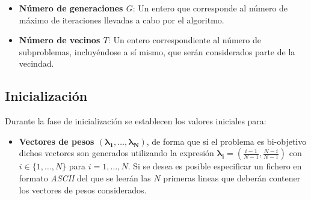 \begin{itemize}
 \item \textbf{Número de generaciones $G$}:  Un entero que corresponde al número de máximo de iteraciones llevadas a cabo por el algoritmo.\\
    
    \item \textbf{Número de vecinos $T$}: Un entero correspondiente al número de subproblemas, incluyéndose a sí mismo, que serán considerados parte de la vecindad.\\
\end{itemize}

\subsection{Inicialización}

Durante la fase de inicialización se establecen los valores iniciales para:\\

\begin{itemize}
\item\textbf{ Vectores de pesos $(\boldsymbol{\lambda_1}, \dots, \boldsymbol{\lambda_N})$}, de forma que si el problema es bi-objetivo dichos vectores son generados utilizando la expresión $\boldsymbol{\lambda_i} = \left(\frac{i-1}{N-1}, \frac{N-i}{N-1} \right)$ con $i \in \{1, \dots, N\}$ para $i=1,\dots, N$. Si se desea es posible especificar un fichero en formato \textit{ASCII} del que se leerán las $N$ primeras lineas que deberán contener los vectores de pesos considerados.\\

\end{itemize}



